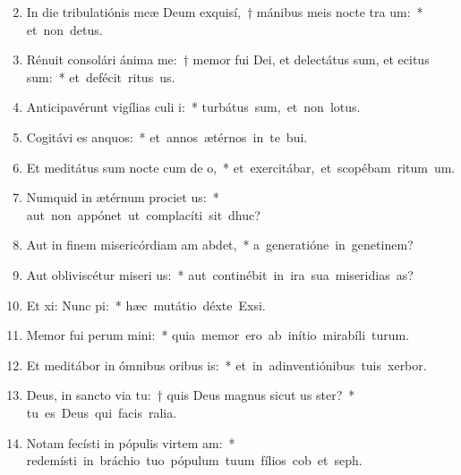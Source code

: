 \begin{flushleft}
\begin{enumerate}[leftmargin=*]
\setcounter{enumi}{1}


\item In die tribulatiónis meæ Deum exquisí,~† mánibus meis nocte tra um:~* \mbox{et non  detus.}
\item Rénuit consolári ánima me:~† memor fui Dei, et delectátus sum, et ecitus sum:~* \mbox{et defécit ritus us.}
\item Anticipavérunt vigílias culi i:~* \mbox{turbátus sum, et non  lotus.}
\item Cogitávi es anquos:~* \mbox{et annos ætérnos in te bui.}
\item Et meditátus sum nocte cum de o,~* \mbox{et exercitábar, et scopébam ritum um.}
\item Numquid in ætérnum prociet us:~* \mbox{aut non appónet ut complacíti sit dhuc?}
\item Aut in finem misericórdiam am abdet,~* \mbox{a generatióne in genetinem?}
\item Aut obliviscétur miseri us:~* \mbox{aut continébit in ira sua miseridias as?}
\item Et xi: Nunc pi:~* \mbox{hæc mutátio déxte Exsi.}
\item Memor fui perum mini:~* \mbox{quia memor ero ab inítio mirabíli turum.}
\item Et meditábor in ómnibus oribus is:~* \mbox{et in adinventiónibus tuis xerbor.}
\item Deus, in sancto via tu:~† quis Deus magnus sicut us ster?~* \mbox{tu es Deus qui facis ralia.}
\item Notam fecísti in pópulis virtem am:~* \mbox{redemísti in bráchio tuo pópulum tuum fílios cob et seph.}

\end{enumerate}
\end{flushleft}
